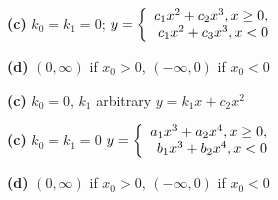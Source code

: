 {\bf (c)}  $k_{0}=k_{1}=0$;
$y=\displaystyle{\left\{\begin{array}{rr}
c_{1}x^{2}+c_{2}x^{3},x\ge0,\\
c_{1}x^{2}+c_{3}x^{3},x<0
\end{array}\right.}$\;

\quad\;  \;  {\bf (d)}  $(0,\infty)$ if $x_{0}>0$, $(-\infty,0)$ if $x_{0}<0$

{\bf (c)}  $k_{0}=0$, $k_{1}$ arbitrary\; $y=k_{1}x+c_{2}x^{2}$

{\bf (c)}  $k_{0}=k_{1}=0$
$y=\displaystyle{\left\{\begin{array}{rr}
a_{1}x^{3}+a_{2}x^{4},x\ge0,\\
b_{1}x^{3}+b_{2}x^{4},x<0
\end{array}\right.}$\;

\quad\;  \;  {\bf (d)}  $(0,\infty)$ if $x_{0}>0$, $(-\infty,0)$ if $x_{0}<0$

